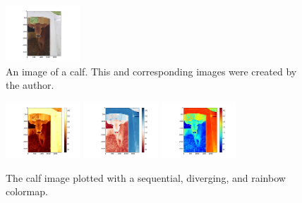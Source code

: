\documentclass[journal]{IEEEtran}
\begin{document}
%
\begin{figure}[H]
\centering
\includegraphics[width=1.1in]{calf_original}%
\caption{An image of a calf. This and corresponding images were created by the author.}
\end{figure}
%
\begin{figure}[H]
\includegraphics[width=1.1in]{calf_sequential}%
\hfil
\includegraphics[width=1.1in]{calf_diverging}%
\hfil
\includegraphics[width=1.1in]{calf_rainbow}%
\caption{The calf image plotted with a
sequential, diverging, and rainbow colormap.}
\end{figure}
\end{document}
